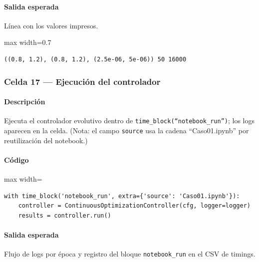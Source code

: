 \paragraph{Salida esperada} Línea con los valores impresos.

\begin{listing}[H]
\caption{Ejemplo Salida}
\begin{adjustbox}{max width=0.7\textwidth}
\begin{minipage}{\textwidth}
\begin{verbatim}
((0.8, 1.2), (0.8, 1.2), (2.5e-06, 5e-06)) 50 16000
\end{verbatim}
\end{minipage}
\end{adjustbox}
\end{listing}

\subsubsection*{Celda 17 — Ejecución del controlador}
\paragraph{Descripción} Ejecuta el controlador evolutivo dentro de \texttt{time\_block(``notebook\_run'')}; los logs aparecen en la celda. (Nota: el campo \texttt{source} usa la cadena ``Caso01.ipynb'' por reutilización del notebook.)
\paragraph{Código}
\begin{listing}[H]
\caption{Celda 17: lanzamiento del proceso de optimización}
\begin{adjustbox}{max width=\textwidth}
\begin{minipage}{\textwidth}
\begin{verbatim}
with time_block('notebook_run', extra={'source': 'Caso01.ipynb'}):
    controller = ContinuousOptimizationController(cfg, logger=logger)
    results = controller.run()
\end{verbatim}
\end{minipage}
\end{adjustbox}
\end{listing}
\paragraph{Salida esperada} Flujo de logs por época y registro del bloque \texttt{notebook\_run} en el CSV de timings.

